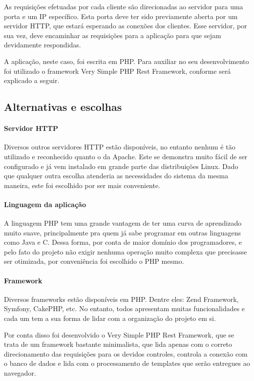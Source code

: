 \documentclass[graduacao,brazil]{ThesisPUC}
\begin{document}
As requisições efetuadas por cada cliente são direcionadas ao servidor para uma porta e um IP específico. Esta porta deve ter sido previamente aberta por um servidor HTTP, que estará esperando as conexões dos clientes. Esse servidor, por sua vez, deve encaminhar as requisições para a aplicação para que sejam devidamente respondidas.

A aplicação, neste caso, foi escrita em PHP. Para auxiliar no seu desenvolvimento foi utilizado o framework Very Simple PHP Rest Framework\cite{RestFW}, conforme será explicado a seguir.

\subsection{Alternativas e escolhas}

\paragraph{Servidor HTTP}

Diversos outros servidores HTTP estão disponíveis, no entanto nenhum é tão utilizado e reconhecido quanto o da Apache. Este se demonstra muito fácil de ser configurado e já vem instalado em grande parte das distribuições Linux. Dado que qualquer outra escolha atenderia as necessidades do sistema da mesma maneira, este foi escolhido por ser mais conveniente.

\paragraph{Linguagem da aplicação}

A linguagem PHP tem uma grande vantagem de ter uma curva de aprendizado muito suave, principalmente pra quem já sabe programar em outras linguagens como Java e C. Dessa forma, por conta de maior domínio dos programadores, e pelo fato do projeto não exigir nenhuma operação muito complexa que precisasse ser otimizada, por conveniência foi escolhido o PHP mesmo.

\paragraph{Framework}

Diversos frameworks estão disponíveis em PHP. Dentre eles: Zend Framework, Symfony, CakePHP, etc. No entanto, todos apresentam muitas funcionalidades e cada um tem a sua forma de lidar com a organização do projeto em si.

Por conta disso foi desenvolvido o Very Simple PHP Rest Framework\cite{RestFW}, que se trata de um framework bastante minimalista, que lida apenas com o correto direcionamento das requisições para os devidos controles, controla a conexão com o banco de dados e lida com o processamento de templates que serão entregues ao navegador.
\end{document}
